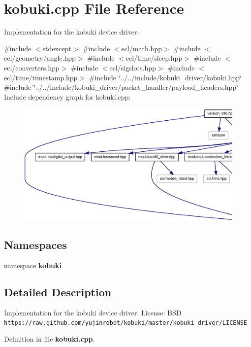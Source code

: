\section{kobuki.\-cpp \-File \-Reference}
\label{kobuki_8cpp}


\-Implementation for the kobuki device driver.  


{\ttfamily \#include $<$stdexcept$>$}\*
{\ttfamily \#include $<$ecl/math.\-hpp$>$}\*
{\ttfamily \#include $<$ecl/geometry/angle.\-hpp$>$}\*
{\ttfamily \#include $<$ecl/time/sleep.\-hpp$>$}\*
{\ttfamily \#include $<$ecl/converters.\-hpp$>$}\*
{\ttfamily \#include $<$ecl/sigslots.\-hpp$>$}\*
{\ttfamily \#include $<$ecl/time/timestamp.\-hpp$>$}\*
{\ttfamily \#include \char`\"{}../../include/kobuki\-\_\-driver/kobuki.\-hpp\char`\"{}}\*
{\ttfamily \#include \char`\"{}../../include/kobuki\-\_\-driver/packet\-\_\-handler/payload\-\_\-headers.\-hpp\char`\"{}}\*
\-Include dependency graph for kobuki.\-cpp\-:
\nopagebreak
\begin{figure}[H]
\begin{center}
\leavevmode
\includegraphics[width=350pt]{kobuki_8cpp__incl}
\end{center}
\end{figure}
\subsection*{\-Namespaces}
\begin{DoxyCompactItemize}
\item 
namespace {\bf kobuki}
\end{DoxyCompactItemize}


\subsection{\-Detailed \-Description}
\-Implementation for the kobuki device driver. \-License\-: \-B\-S\-D {\tt https\-://raw.\-github.\-com/yujinrobot/kobuki/master/kobuki\-\_\-driver/\-L\-I\-C\-E\-N\-S\-E} 

\-Definition in file {\bf kobuki.\-cpp}.

